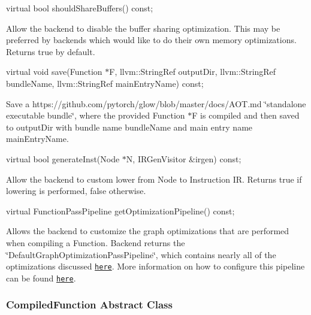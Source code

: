 \begin{DoxyItemize}
\begin{DoxyItemize}
\end{DoxyItemize}
\item {\ttfamily virtual bool should\+Share\+Buffers() const;}
\begin{DoxyItemize}
\item Allow the backend to disable the buffer sharing optimization. This may be preferred by backends which would like to do their own memory optimizations. Returns true by default.
\end{DoxyItemize}
\item {\ttfamily virtual void save(Function $\ast$F, llvm\+::\+String\+Ref output\+Dir, llvm\+::\+String\+Ref bundle\+Name, llvm\+::\+String\+Ref main\+Entry\+Name) const;}
\begin{DoxyItemize}
\item Save a https\+://github.com/pytorch/glow/blob/master/docs/\+A\+O\+T.\+md \char`\"{}standalone executable
    bundle\char`\"{}, where the provided {\ttfamily Function $\ast$F} is compiled and then saved to {\ttfamily output\+Dir} with bundle name {\ttfamily bundle\+Name} and main entry name {\ttfamily main\+Entry\+Name}.
\end{DoxyItemize}
\item {\ttfamily virtual bool generate\+Inst(\+Node $\ast$\+N, I\+R\+Gen\+Visitor \&irgen) const;}
\begin{DoxyItemize}
\item Allow the backend to custom lower from Node to Instruction IR. Returns true if lowering is performed, false otherwise.
\end{DoxyItemize}
\item {\ttfamily virtual Function\+Pass\+Pipeline get\+Optimization\+Pipeline() const;}
\begin{DoxyItemize}
\item Allows the backend to customize the graph optimizations that are performed when compiling a Function. Backend returns the \char`\"{}\+Default\+Graph\+Optimization\+Pass\+Pipeline\char`\"{}, which contains nearly all of the optimizations discussed \href{Optimizations.md#set-of-supported-graph-optimizations}{\tt here}. More information on how to configure this pipeline can be found \href{Optimizations.md#configuring-a-graph-optimization-pipeline}{\tt here}.
\end{DoxyItemize}
\end{DoxyItemize}

\subsubsection*{{\ttfamily Compiled\+Function} Abstract Class}

